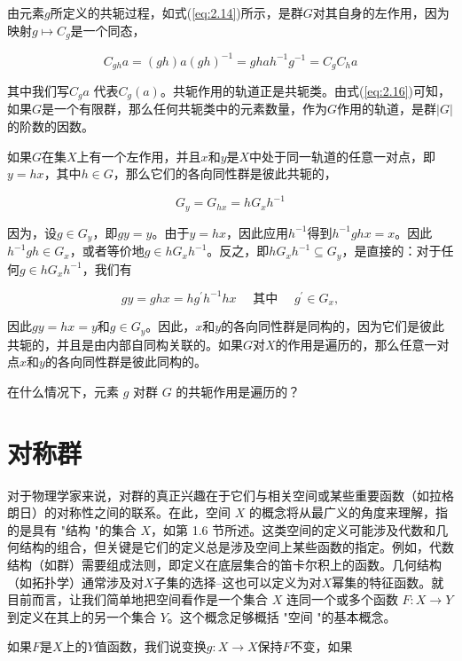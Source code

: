 \begin{eg}
由元素$g$所定义的共轭过程，如式(\ref{eq:2.14})所示，是群$G$对其自身的左作用，因为映射$g \mapsto C_{g}$是一个同态，

$$
C_{g h} a=(g h) a(g h)^{-1}=g h a h^{-1} g^{-1}=C_{g} C_{h} a
$$

其中我们写$C_{g} a$ 代表$C_{g}(a)$。共轭作用的轨道正是共轭类。由式(\ref{eq:2.16})可知，如果$G$是一个有限群，那么任何共轭类中的元素数量，作为$G$作用的轨道，是群$|G|$的阶数的因数。

如果$G$在集$X$上有一个左作用，并且$x$和$y$是$X$中处于同一轨道的任意一对点，即$y=h x$，其中$h \in G$，那么它们的各向同性群是彼此共轭的，


\begin{equation}
    G_{y}=G_{h x}=h G_{x} h^{-1}
\end{equation}

因为，设$g \in G_{y}$，即$g y=y$。由于$y=h x$，因此应用$h^{-1}$得到$h^{-1} g h x=x$。因此$h^{-1} g h \in G_{x}$，或者等价地$g \in h G_{x} h^{-1}$。反之，即$h G_{x} h^{-1} \subseteq G_{y}$，是直接的：对于任何$g \in h G_{x} h^{-1}$，我们有

$$
g y=g h x=h g^{\prime} h^{-1} h x \quad \text { 其中 } \quad g^{\prime} \in G_{x},
$$

因此$g y=h x=y$和$g \in G_{y}$。因此，$x$和$y$的各向同性群是同构的，因为它们是彼此共轭的，并且是由内部自同构关联的。如果$G$对$X$的作用是遍历的，那么任意一对点$x$和$y$的各向同性群是彼此同构的。
\end{eg}
\begin{exercise}
    在什么情况下，元素 $g$ 对群 $G$ 的共轭作用是遍历的？
\end{exercise}

\section{对称群}
对于物理学家来说，对群的真正兴趣在于它们与相关空间或某些重要函数（如拉格朗日）的对称性之间的联系。在此，空间 $X$ 的概念将从最广义的角度来理解，指的是具有 "结构 "的集合 $X$，如第 1.6 节所述。这类空间的定义可能涉及代数和几何结构的组合，但关键是它们的定义总是涉及空间上某些函数的指定。例如，代数结构（如群）需要组成法则，即定义在底层集合的笛卡尔积上的函数。几何结构（如拓扑学）通常涉及对$X$子集的选择--这也可以定义为对$X$幂集的特征函数。就目前而言，让我们简单地把空间看作是一个集合 $X$ 连同一个或多个函数 $F: X \rightarrow Y$ 到定义在其上的另一个集合 $Y$。这个概念足够概括 "空间 "的基本概念。

如果$F$是$X$上的$Y$值函数，我们说变换$g: X \rightarrow X$保持$F$不变，如果

